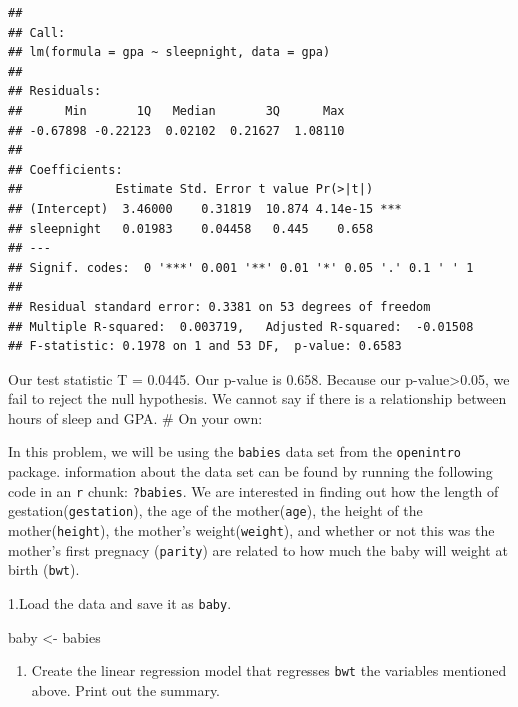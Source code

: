 \documentclass[]{article}
\newenvironment{Shaded}{\begin{snugshade}}{\end{snugshade}}
\newcommand{\DataTypeTok}[1]{\textcolor[rgb]{0.13,0.29,0.53}{#1}}
\newcommand{\KeywordTok}[1]{\textcolor[rgb]{0.13,0.29,0.53}{\textbf{#1}}}
\newcommand{\NormalTok}[1]{#1}
\newcommand{\OperatorTok}[1]{\textcolor[rgb]{0.81,0.36,0.00}{\textbf{#1}}}
\newcommand{\StringTok}[1]{\textcolor[rgb]{0.31,0.60,0.02}{#1}}
\providecommand{\tightlist}{%
  \setlength{\itemsep}{0pt}\setlength{\parskip}{0pt}}
\begin{document}
\begin{verbatim}
## 
## Call:
## lm(formula = gpa ~ sleepnight, data = gpa)
## 
## Residuals:
##      Min       1Q   Median       3Q      Max 
## -0.67898 -0.22123  0.02102  0.21627  1.08110 
## 
## Coefficients:
##             Estimate Std. Error t value Pr(>|t|)    
## (Intercept)  3.46000    0.31819  10.874 4.14e-15 ***
## sleepnight   0.01983    0.04458   0.445    0.658    
## ---
## Signif. codes:  0 '***' 0.001 '**' 0.01 '*' 0.05 '.' 0.1 ' ' 1
## 
## Residual standard error: 0.3381 on 53 degrees of freedom
## Multiple R-squared:  0.003719,   Adjusted R-squared:  -0.01508 
## F-statistic: 0.1978 on 1 and 53 DF,  p-value: 0.6583
\end{verbatim}

Our test statistic T = 0.0445. Our p-value is 0.658. Because our
p-value\textgreater{}0.05, we fail to reject the null hypothesis. We
cannot say if there is a relationship between hours of sleep and GPA.
\newpage \# On your own:

In this problem, we will be using the \texttt{babies} data set from the
\texttt{openintro} package. information about the data set can be found
by running the following code in an \texttt{r} chunk: \texttt{?babies}.
We are interested in finding out how the length of
gestation(\texttt{gestation}), the age of the mother(\texttt{age}), the
height of the mother(\texttt{height}), the mother's
weight(\texttt{weight}), and whether or not this was the mother's first
pregnacy (\texttt{parity}) are related to how much the baby will weight
at birth (\texttt{bwt}).

1.Load the data and save it as \texttt{baby}.

\begin{Shaded}
\begin{Highlighting}[]
\NormalTok{baby <-}\StringTok{ }\NormalTok{babies}
\end{Highlighting}
\end{Shaded}

\begin{enumerate}
\def\labelenumi{\arabic{enumi}.}
\setcounter{enumi}{1}
\tightlist
\item
  Create the linear regression model that regresses \texttt{bwt} the
  variables mentioned above. Print out the summary.
\end{enumerate}

\begin{Shaded}
\end{Shaded}
\end{document}
